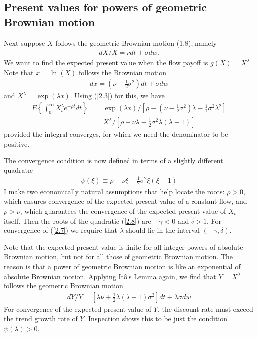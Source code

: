 \documentclass[12pt]{article}
\theoremstyle{definition}
\begin{document}
\subsection{Present values for powers of geometric Brownian motion}
Next suppose $X$ follows the geometric Brownian motion (1.8), namely
\begin{align*}
d X / X=\nu d t+\sigma dw.
\end{align*}
We want to find the expected present value when the flow payoff is $g(X)=X^{\lambda}$. Note that $x=\ln (X)$ follows the Brownian motion
\begin{align*}
d x=\left(\nu-\frac{1}{2} \sigma^{2}\right) dt+\sigma dw
\end{align*}
and $X^{\lambda}=\exp (\lambda x)$. Using (\ref{2.3}) for this, we have
\begin{align}
E\left\{\int_{0}^{\infty} X_{t}^{\lambda} e^{-\rho t} d t\right\} & =\exp (\lambda x) /\left[\rho-\left(\nu-\frac{1}{2} \sigma^{2}\right) \lambda-\frac{1}{2} \sigma^{2} \lambda^{2}\right] \\
& =X^{\lambda} /\left[\rho-\nu \lambda-\frac{1}{2} \sigma^{2} \lambda(\lambda-1)\right]
\label{2.7}
\end{align}
provided the integral converges, for which we need the denominator to be positive.

The convergence condition is now defined in terms of a slightly different quadratic
\begin{align}
\psi(\xi) \equiv \rho-\nu \xi-\frac{1}{2} \sigma^{2} \xi(\xi-1) \label{2.8}
\end{align}
I make two economically natural assumptions that help locate the roots: $\rho>0$, which ensures convergence of the expected present value of a constant flow, and $\rho>\nu$, which guarantees the convergence
of the expected present value of $X_{t}$ itself. Then the roots of the quadratic (\ref{2.8}) are $-\gamma<0$ and $\delta>1$. For convergence of (\ref{2.7}) we require that $\lambda$ should lie in the interval $(-\gamma, \delta)$.

Note that the expected present value is finite for all integer powers of absolute Brownian motion, but not for all those of geometric Brownian motion. The reason is that a power of geometric Brownian motion is like an exponential of absolute Brownian motion. Applying Itô's Lemma again, we find that $Y=X^{\lambda}$ follows the geometric Brownian motion
\begin{align*}
d Y / Y=\left[\lambda \nu+\frac{1}{2} \lambda(\lambda-1) \sigma^{2}\right] dt+\lambda \sigma dw
\end{align*}
For convergence of the expected present value of $Y$, the discount rate must exceed the trend growth rate of $Y$. Inspection shows this to be just the condition $\psi(\lambda)>0$.
\end{document}
